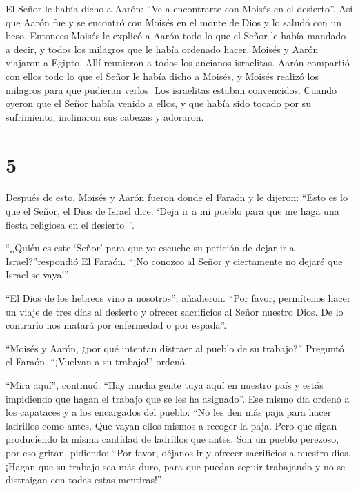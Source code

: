  El Señor le había dicho a Aarón: ``Ve a encontrarte con
Moisés en el desierto''. Así que Aarón fue y se encontró con Moisés en
el monte de Dios y lo saludó con un beso.  Entonces Moisés
le explicó a Aarón todo lo que el Señor le había mandado a decir, y
todos los milagros que le había ordenado hacer.  Moisés y
Aarón viajaron a Egipto. Allí reunieron a todos los ancianos israelitas.
 Aarón compartió con ellos todo lo que el Señor le había
dicho a Moisés, y Moisés realizó los milagros para que pudieran verlos.
 Los israelitas estaban convencidos. Cuando oyeron que el
Señor había venido a ellos, y que había sido tocado por su sufrimiento,
inclinaron sus cabezas y adoraron.

\hypertarget{section-4}{%
\section{5}\label{section-4}}

 Después de esto, Moisés y Aarón fueron donde el Faraón y le
dijeron: ``Esto es lo que el Señor, el Dios de Israel dice: `Deja ir a
mi pueblo para que me haga una fiesta religiosa en el desierto'\,''.

 ``¿Quién es este `Señor' para que yo escuche su petición de
dejar ir a Israel?''respondió El Faraón. ``¡No conozco al Señor y
ciertamente no dejaré que Israel se vaya!''

 ``El Dios de los hebreos vino a nosotros'', añadieron.
``Por favor, permítenos hacer un viaje de tres días al desierto y
ofrecer sacrificios al Señor nuestro Dios. De lo contrario nos matará
por enfermedad o por espada''.

 ``Moisés y Aarón, ¿por qué intentan distraer al pueblo de
su trabajo?'' Preguntó el Faraón. ``¡Vuelvan a su trabajo!'' ordenó.

 ``Mira aquí'', continuó. ``Hay mucha gente tuya aquí en
nuestro país y estás impidiendo que hagan el trabajo que se les ha
asignado''.  Ese mismo día ordenó a los capataces y a los
encargados del pueblo:  ``No les den más paja para hacer
ladrillos como antes. Que vayan ellos mismos a recoger la paja.
 Pero que sigan produciendo la misma cantidad de ladrillos
que antes. Son un pueblo perezoso, por eso gritan, pidiendo: ``Por
favor, déjanos ir y ofrecer sacrificios a nuestro dios. 
¡Hagan que su trabajo sea más duro, para que puedan seguir trabajando y
no se distraigan con todas estas mentiras!''

